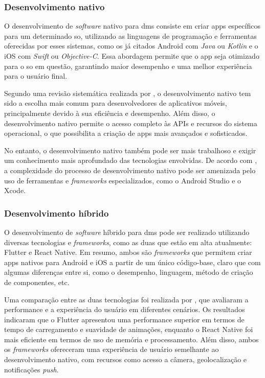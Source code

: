 \subsubsection{Desenvolvimento nativo}\label{sssec:dev_apps_nativo}
O desenvolvimento de \textit{software} nativo para \acp{dm} consiste em criar \acp{app} específicos para um determinado \ac{so}, utilizando as linguagens de programação e ferramentas oferecidas por esses sistemas, como os já citados Android com \textit{Java} ou \textit{Kotlin} e o iOS com \textit{Swift} ou \textit{Objective-C}. Essa abordagem permite que o \ac{app} seja otimizado para o \ac{so} em questão, garantindo maior desempenho e uma melhor experiência para o usuário final.

Segundo uma revisão sistemática realizada por \cite{Sarker2021}, o desenvolvimento nativo tem sido a escolha mais comum para desenvolvedores de aplicativos móveis, principalmente devido à sua eficiência e desempenho. Além disso, o desenvolvimento nativo permite o acesso completo às APIs e recursos do sistema operacional, o que possibilita a criação de \acp{app} mais avançados e sofisticados.

No entanto, o desenvolvimento nativo também pode ser mais trabalhoso e exigir um conhecimento mais aprofundado das tecnologias envolvidas. De acordo com \cite{Biswal2020}, a complexidade do processo de desenvolvimento nativo pode ser amenizada pelo uso de ferramentas e \textit{frameworks} especializados, como o Android Studio e o Xcode.

\subsubsection{Desenvolvimento híbrido}\label{sssec:dev_apps_hibrido}
O desenvolvimento de \textit{software} híbrido para \acp{dm} pode ser realizado utilizando diversas tecnologias e \textit{frameworks}, como as duas que estão em alta atualmente: Flutter e React Native. Em resumo, ambos são \textit{frameworks} que permitem criar \acp{app} nativos para Android e iOS a partir de um único código-base, claro que com algumas diferenças entre si, como o desempenho, linguagem, método de criação de componentes, etc.

Uma comparação entre as duas tecnologias foi realizada por \cite{GuhaBanerjee2020}, que avaliaram a performance e a experiência do usuário em diferentes cenários. Os resultados indicaram que o Flutter apresentou uma performance superior em termos de tempo de carregamento e suavidade de animações, enquanto o React Native foi mais eficiente em termos de uso de memória e processamento. Além disso, ambos os \textit{frameworks} ofereceram uma ex\-pe\-ri\-ên\-ci\-a de usuário semelhante ao desenvolvimento nativo, com recursos como acesso a câmera, geolocalização e notificações \textit{push}.

